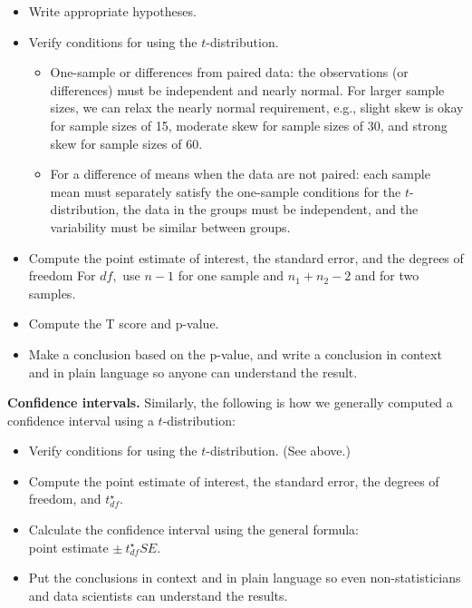 \documentclass[
  10pt,
  openany]{book}
\providecommand{\tightlist}{%
  \setlength{\itemsep}{0pt}\setlength{\parskip}{0pt}}
\begin{document}
\begin{itemize}
\item
  Write appropriate hypotheses.
\item
  Verify conditions for using the \(t\)-distribution.

  \begin{itemize}
  \tightlist
  \item
    One-sample or differences from paired data: the observations (or differences) must be independent and nearly normal. For larger sample sizes, we can relax the nearly normal requirement, e.g., slight skew is okay for sample sizes of 15, moderate skew for sample sizes of 30, and strong skew for sample sizes of 60.
  \item
    For a difference of means when the data are not paired: each sample mean must separately satisfy the one-sample conditions for the \(t\)-distribution, the data in the groups must be independent, and the variability must be similar between groups.
  \end{itemize}
\item
  Compute the point estimate of interest, the standard error, and the degrees of freedom For \(df,\) use \(n-1\) for one sample and \(n_1 + n_2 - 2\) and for two samples.
\item
  Compute the T score and p-value.
\item
  Make a conclusion based on the p-value, and write a conclusion in context and in plain language so anyone can understand the result.
\end{itemize}

\textbf{Confidence intervals.} Similarly, the following is how we generally computed a confidence interval using a \(t\)-distribution:

\begin{itemize}
\tightlist
\item
  Verify conditions for using the \(t\)-distribution. (See above.)
\item
  Compute the point estimate of interest, the standard error, the degrees of freedom, and \(t^{\star}_{df}.\)
\item
  Calculate the confidence interval using the general formula:\\
  point estimate \(\pm\ t_{df}^{\star} SE.\)
\item
  Put the conclusions in context and in plain language so even non-statisticians and data scientists can understand the results.
\end{itemize}
\end{document}

